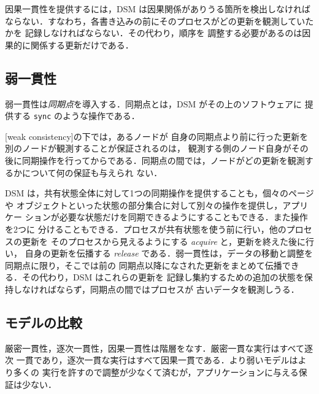 \documentclass[../main.tex]{subfiles}
\begin{document}
因果一貫性を提供するには，DSM は因果関係がありうる箇所を検出しなければ
ならない．すなわち，各書き込みの前にそのプロセスがどの更新を観測していたかを
記録しなければならない．その代わり，順序を
調整する必要があるのは因果的に関係する更新だけである．

\subsection{弱一貫性}

弱一貫性は\emph{同期点}を導入する．同期点とは，DSM がその上のソフトウェアに
提供する \texttt{sync} のような操作である．

\begin{definition}[弱一貫性]
  [weak consistency]の下では，あるノードが
  自身の同期点より前に行った更新を別のノードが観測することが保証されるのは，
  観測する側のノード自身がその後に同期操作を行ってからである．同期点の間では，ノードがどの更新を観測するかについて何の保証も与えられ
  ない．
\end{definition}

DSM は，共有状態全体に対して1つの同期操作を提供することも，個々のページや
オブジェクトといった状態の部分集合に対して別々の操作を提供し，アプリケー
ションが必要な状態だけを同期できるようにすることもできる．また操作を2つに
分けることもできる．プロセスが共有状態を使う前に行い，他のプロセスの更新を
そのプロセスから見えるようにする \emph{acquire} と，更新を終えた後に行い，
自身の更新を伝播する \emph{release} である．弱一貫性は，データの移動と調整を同期点に限り，そこでは前の
同期点以降になされた更新をまとめて伝播できる．その代わり，DSM はこれらの更新を
記録し集約するための追加の状態を保持しなければならず，同期点の間ではプロセスが
古いデータを観測しうる．

\subsection{モデルの比較}

厳密一貫性，逐次一貫性，因果一貫性は階層をなす．厳密一貫な実行はすべて逐次
一貫であり，逐次一貫な実行はすべて因果一貫である．より弱いモデルはより多くの
実行を許すので調整が少なくて済むが，アプリケーションに与える保証は少ない．
\end{document}
